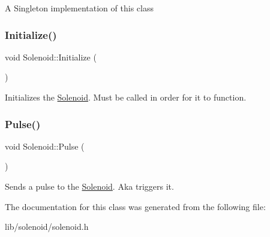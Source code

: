 A Singleton implementation of this class \hypertarget{class_solenoid_a6093fb381f87eee3e22c6dfc97f3fdc0}{}\label{class_solenoid_a6093fb381f87eee3e22c6dfc97f3fdc0} 
\subsubsection{\texorpdfstring{Initialize()}{Initialize()}}
{\footnotesize\ttfamily void Solenoid\+::\+Initialize (\begin{DoxyParamCaption}{ }\end{DoxyParamCaption})}

Initializes the \hyperlink{class_solenoid}{Solenoid}. Must be called in order for it to function. \hypertarget{class_solenoid_a50bc0121679bd1ff11323f1c88fe2ec6}{}\label{class_solenoid_a50bc0121679bd1ff11323f1c88fe2ec6} 
\subsubsection{\texorpdfstring{Pulse()}{Pulse()}}
{\footnotesize\ttfamily void Solenoid\+::\+Pulse (\begin{DoxyParamCaption}{ }\end{DoxyParamCaption})}

Sends a pulse to the \hyperlink{class_solenoid}{Solenoid}. Aka triggers it. 

The documentation for this class was generated from the following file\+:\begin{DoxyCompactItemize}
\item 
lib/solenoid/solenoid.\+h\end{DoxyCompactItemize}

